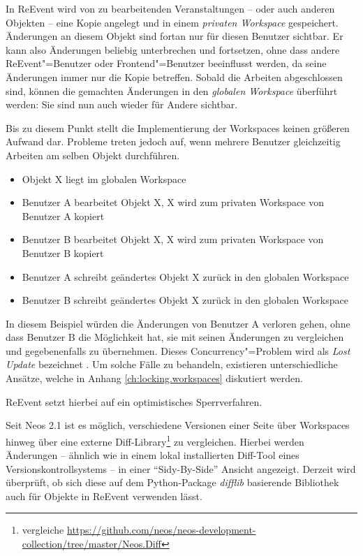 In ReEvent wird von zu bearbeitenden Veranstaltungen -- oder auch anderen Objekten -- eine Kopie angelegt und in einem \emph{privaten Workspace} gespeichert. Änderungen an diesem Objekt sind fortan nur für diesen Benutzer sichtbar. Er kann also Änderungen beliebig unterbrechen und fortsetzen, ohne dass andere ReEvent"=Benutzer oder Frontend"=Benutzer beeinflusst werden, da seine Änderungen immer nur die Kopie betreffen. Sobald die Arbeiten abgeschlossen sind, können die gemachten Änderungen in den \emph{globalen Workspace} überführt werden: Sie sind nun auch wieder für Andere sichtbar.

Bis zu diesem Punkt stellt die Implementierung der Workspaces keinen größeren Aufwand dar. Probleme treten jedoch auf, wenn mehrere Benutzer gleichzeitig Arbeiten am selben Objekt durchführen.

\begin{itemize}
	\item Objekt X liegt im globalen Workspace
	\item Benutzer A bearbeitet Objekt X, X wird zum privaten Workspace von Benutzer A kopiert
	\item Benutzer B bearbeitet Objekt X, X wird zum privaten Workspace von Benutzer B kopiert
	\item Benutzer A schreibt geändertes Objekt X zurück in den globalen Workspace
	\item Benutzer B schreibt geändertes Objekt X zurück in den globalen Workspace
\end{itemize}

In diesem Beispiel würden die Änderungen von Benutzer A verloren gehen, ohne dass Benutzer B die Möglichkeit hat, sie mit seinen Änderungen zu vergleichen und gegebenenfalls zu übernehmen. Dieses Concurrency"=Problem wird als \emph{Lost Update} bezeichnet \cite[S. 186f]{Bernstein.1981}. Um solche Fälle zu behandeln, existieren unterschiedliche Ansätze, welche in Anhang \ref{ch:locking.workspaces} diskutiert werden.

ReEvent setzt hierbei auf ein optimistisches Sperrverfahren.

Seit Neos 2.1 ist es möglich, verschiedene Versionen einer Seite über Workspaces hinweg über eine externe Diff-Library\footnote{vergleiche \url{https://github.com/neos/neos-development-collection/tree/master/Neos.Diff}} zu vergleichen. Hierbei werden Änderungen -- ähnlich wie in einem lokal installierten Diff-Tool eines Versionskontrollsystems -- in einer \enquote{Sidy-By-Side} Ansicht angezeigt. Derzeit wird überprüft, ob sich diese auf dem Python-Package \emph{difflib} basierende Bibliothek auch für Objekte in ReEvent verwenden lässt.

